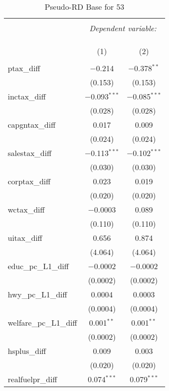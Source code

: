 
\begin{table}[!htbp] \centering 
  \caption{Pseudo-RD Base for  53} 
  \label{} 
\begin{tabular}{@{\extracolsep{5pt}}lcc} 
\\[-1.8ex]\hline 
\hline \\[-1.8ex] 
 & \multicolumn{2}{c}{\textit{Dependent variable:}} \\ 
\cline{2-3} 
\\[-1.8ex] & \multicolumn{2}{c}{ } \\ 
\\[-1.8ex] & (1) & (2)\\ 
\hline \\[-1.8ex] 
 ptax\_diff & $-$0.214 & $-$0.378$^{**}$ \\ 
  & (0.153) & (0.153) \\ 
  inctax\_diff & $-$0.093$^{***}$ & $-$0.085$^{***}$ \\ 
  & (0.028) & (0.028) \\ 
  capgntax\_diff & 0.017 & 0.009 \\ 
  & (0.024) & (0.024) \\ 
  salestax\_diff & $-$0.113$^{***}$ & $-$0.102$^{***}$ \\ 
  & (0.030) & (0.030) \\ 
  corptax\_diff & 0.023 & 0.019 \\ 
  & (0.020) & (0.020) \\ 
  wctax\_diff & $-$0.0003 & 0.089 \\ 
  & (0.110) & (0.110) \\ 
  uitax\_diff & 0.656 & 0.874 \\ 
  & (4.064) & (4.064) \\ 
  educ\_pc\_L1\_diff & $-$0.0002 & $-$0.0002 \\ 
  & (0.0002) & (0.0002) \\ 
  hwy\_pc\_L1\_diff & 0.0004 & 0.0003 \\ 
  & (0.0004) & (0.0004) \\ 
  welfare\_pc\_L1\_diff & 0.001$^{**}$ & 0.001$^{**}$ \\ 
  & (0.0002) & (0.0002) \\ 
  hsplus\_diff & 0.009 & 0.003 \\ 
  & (0.020) & (0.020) \\ 
  realfuelpr\_diff & 0.074$^{***}$ & 0.079$^{***}$ \\ 

\end{tabular}
\end{table}
